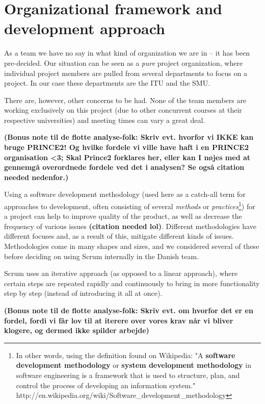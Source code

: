 \section{Organizational framework and development approach}
\label{sec:organizational}

As a team we have no say in what kind of organization we are in – it has been pre-decided. Our
situation can be seen as a \emph{pure} project organization\cite{caye}, where individual project members are
pulled from several departments to focus on a project. In our case these departments are the
ITU and the SMU.

There are, however, other concerns to be had. None of the team members are working exclusively
on this project (due to other concurrent courses at their respective universities) and meeting
times can vary a great deal.

\textbf{(Bonus note til de flotte analyse-folk: Skriv evt. hvorfor vi IKKE kan bruge PRINCE2!
Og hvilke fordele vi ville have haft i en PRINCE2 organisation <3; Skal Prince2 forklares her,
eller kan I nøjes med at gennemgå overordnede fordele ved det i analysen? Se også citation
needed nedenfor.)}


Using a software development methodology (used here as a catch-all term for approaches to
development, often consisting of several \emph{methods} or \emph{practices}\footnote{In other
words, using the definition found on Wikipedia: "A \textbf{software development methodology}
or \textbf{system development methodology} in software engineering is a framework that is used
to structure, plan, and control the process of developing an information system."
http://en.wikipedia.org/wiki/Software_development_methodology}) for a project can help to
improve quality of the product, as well as decrease the frequency of various issues \textbf{
(citation needed lol)}. Different methodologies have different focuses and, as a result of
this, mitigate different kinds of issues. Methodologies come in many shapes and sizes, and we
considered several of these before deciding on using Scrum internally in the Danish team.

Scrum uses an iterative approach (as opposed to a linear approach), where certain steps are
repeated rapidly and continuously to bring in more functionality step by step (instead of
introducing it all at once).

\textbf{(Bonus note til de flotte analyse-folk: Skriv evt. om hvorfor det er en fordel, fordi
vi får lov til at iterere over vores krav når vi bliver klogere, og dermed ikke spilder arbejde)}

